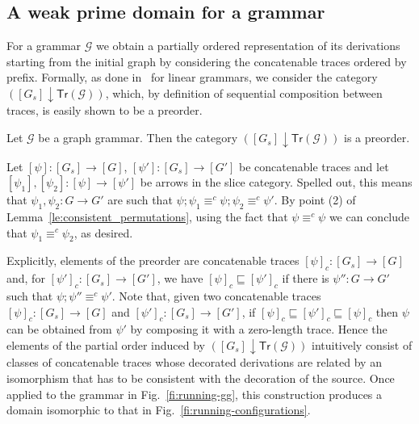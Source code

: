 \documentclass[conference]{IEEEtran}
\renewenvironment{proof}{\begin{IEEEproof}}{\end{IEEEproof}}
\newcommand{\slice}[2]{\ensuremath{({#1} \downarrow {#2})}}
\newcommand{\tr}[1]{\ensuremath{\mathsf{Tr}({#1})}}
\begin{document}

\subsection{A weak prime domain for a grammar}
\label{ss:graph-dom}

For a grammar $\mathcal{G}$ we obtain a partially ordered representation of its derivations
starting from the initial graph by considering the concatenable traces ordered 
by prefix. 
%
Formally, as done in~\cite{Handbook,Bal:PhD} for linear
grammars, we consider the category
$\slice{[G_s]}{\tr{\mathcal{G}}}$, which, by definition of sequential
composition between traces, is easily shown to be a preorder.

\begin{proposition}
  Let $\mathcal{G}$ be a graph grammar. Then the category
  $\slice{[G_s]}{\tr{\mathcal{G}}}$ is a preorder.
\end{proposition}

\begin{proof}
  Let $[\psi] : [G_s] \to [G]$, $[\psi'] : [G_s] \to [G']$ be
  concatenable traces and let
  $[\psi_1], [\psi_2] : [\psi] \to [\psi']$ be arrows in the slice
  category. Spelled out, this means that $\psi_1, \psi_2: G \to G'$
  are such that $\psi; \psi_1 \equiv^c \psi; \psi_2 \equiv^c
  \psi'$. By point (2) of Lemma~\ref{le:consistent_permutations}, 
  using the fact that $\psi \equiv^c \psi$ we can conclude
  that $\psi_1 \equiv^c \psi_2$, as desired. 
%    
 \end{proof}

Explicitly, elements of the preorder are concatenable traces
$[\psi]_c : [G_s] \to [G]$ and, for $[\psi']_c : [G_s] \to [G']$, we
have $[\psi]_c \sqsubseteq [\psi']_c$ if there is $\psi'' : G \to G'$
such that $\psi ; \psi'' \equiv^c \psi'$.
%
Note that, given two concatenable traces $[\psi]_c : [G_s] \to [G]$
and $[\psi']_c : [G_s] \to [G']$, if
$[\psi]_c \sqsubseteq [\psi']_c \sqsubseteq [\psi]_c$ then $\psi$ can be
obtained from $\psi'$  by composing it with a zero-length
trace. Hence the elements of the partial order induced by
$\slice{[G_s]}{\tr{\mathcal{G}}}$ intuitively consist of classes of
concatenable traces whose decorated derivations  are
related by an isomorphism that has to be consistent with
the decoration of the source.
%
Once applied to the grammar in Fig.~\ref{fi:running-gg}, this
construction produces a domain isomorphic to that in
Fig.~\ref{fi:running-configurations}.
\end{document}
